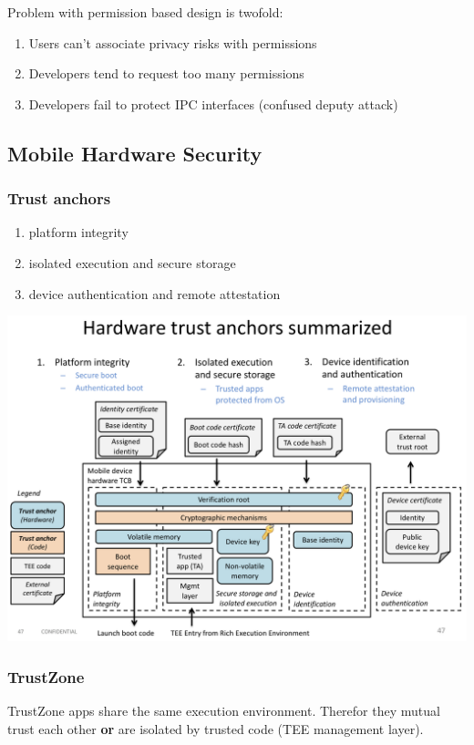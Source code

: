 Problem with permission based design is twofold:
\begin{enumerate}
    \item Users can't associate privacy risks with permissions
    \item Developers tend to request too many permissions
    \item Developers fail to protect IPC interfaces (confused deputy attack)
\end{enumerate}

\subsection{Mobile Hardware Security}
\subsubsection{Trust anchors}
\begin{enumerate}
    \item platform integrity
    \item isolated execution and secure storage
    \item device authentication and remote attestation
\end{enumerate}

\begin{center}
    \includegraphics[width=0.85\linewidth]{images/mobile_sec_HardwareTrustAnchors.png}
\end{center}

\subsubsection{TrustZone}
TrustZone apps share the same execution environment. Therefor they mutual trust each other \textbf{or} are isolated by trusted code (TEE management layer).

